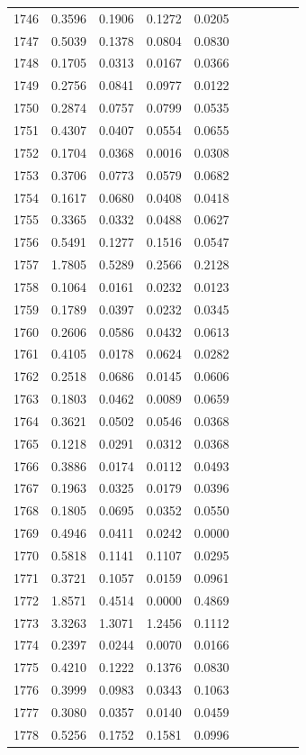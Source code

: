 \begin{table}
\begin{tabular}{cccccccccc}
1746& 0.3596& 0.1906& 0.1272& 0.0205\\ 
1747& 0.5039& 0.1378& 0.0804& 0.0830\\ 
1748& 0.1705& 0.0313& 0.0167& 0.0366\\ 
1749& 0.2756& 0.0841& 0.0977& 0.0122\\ 
1750& 0.2874& 0.0757& 0.0799& 0.0535\\ 
1751& 0.4307& 0.0407& 0.0554& 0.0655\\ 
1752& 0.1704& 0.0368& 0.0016& 0.0308\\ 
1753& 0.3706& 0.0773& 0.0579& 0.0682\\ 
1754& 0.1617& 0.0680& 0.0408& 0.0418\\ 
1755& 0.3365& 0.0332& 0.0488& 0.0627\\ 
1756& 0.5491& 0.1277& 0.1516& 0.0547\\ 
1757& 1.7805& 0.5289& 0.2566& 0.2128\\ 
1758& 0.1064& 0.0161& 0.0232& 0.0123\\ 
1759& 0.1789& 0.0397& 0.0232& 0.0345\\ 
1760& 0.2606& 0.0586& 0.0432& 0.0613\\ 
1761& 0.4105& 0.0178& 0.0624& 0.0282\\ 
1762& 0.2518& 0.0686& 0.0145& 0.0606\\ 
1763& 0.1803& 0.0462& 0.0089& 0.0659\\ 
1764& 0.3621& 0.0502& 0.0546& 0.0368\\ 
1765& 0.1218& 0.0291& 0.0312& 0.0368\\ 
1766& 0.3886& 0.0174& 0.0112& 0.0493\\ 
1767& 0.1963& 0.0325& 0.0179& 0.0396\\ 
1768& 0.1805& 0.0695& 0.0352& 0.0550\\ 
1769& 0.4946& 0.0411& 0.0242& 0.0000\\ 
1770& 0.5818& 0.1141& 0.1107& 0.0295\\ 
1771& 0.3721& 0.1057& 0.0159& 0.0961\\ 
1772& 1.8571& 0.4514& 0.0000& 0.4869\\ 
1773& 3.3263& 1.3071& 1.2456& 0.1112\\ 
1774& 0.2397& 0.0244& 0.0070& 0.0166\\ 
1775& 0.4210& 0.1222& 0.1376& 0.0830\\ 
1776& 0.3999& 0.0983& 0.0343& 0.1063\\ 
1777& 0.3080& 0.0357& 0.0140& 0.0459\\ 
1778& 0.5256& 0.1752& 0.1581& 0.0996\\ 

\end{tabular}
\end{table}
